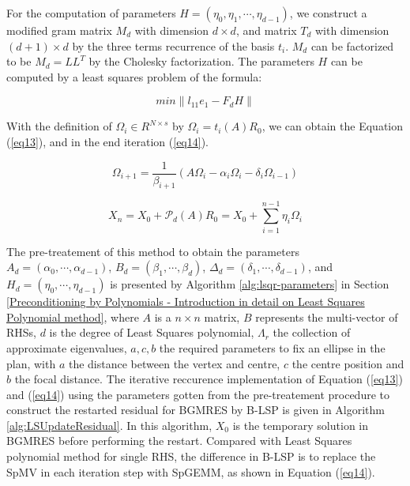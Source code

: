 For the computation of parameters $H=(\eta_0,\eta_1,\cdots,\eta_{d-1})$, we construct a modified gram matrix $M_d$ with dimension $d \times d$, and matrix $T_d$ with dimension $(d+1) \times d$ by the three terms recurrence of the basis $t_i$. $M_d$ can be factorized to be $M_d=LL^T$ by the Cholesky factorization. The parameters $H$ can be computed by a least squares problem of the formula:


\begin{equation}
\label{eq1122}
min \|l_{11}e_1-F_d H\|
\end{equation}


With the definition of \(\Omega_i \in R^{N \times s}\) by \(\Omega_i=t_i(A)R_0\), we can obtain the Equation (\ref{eq13}), and in the end iteration  (\ref{eq14}).

\begin{equation}
\label{eq13}
\Omega_{i+1}=\frac{1}{\beta_{i+1}}(A\Omega_i-\alpha_i\Omega_i-\delta_i\Omega_{i-1})
\end{equation}

\begin{equation}
\label{eq14}
X_n=X_0+\mathcal{P}_d(A)R_0=X_0+\sum_{i=1}^{n-1}\eta_i\Omega_i
\end{equation}

The pre-treatement of this method to obtain the parameters $A_d=(\alpha_0, \cdots, \alpha_{d-1})$, $B_d=(\beta_1, \cdots, \beta_d)$, $\Delta_d=(\delta_1, \cdots, \delta_{d-1})$, and $H_d=(\eta_0, \cdots, \eta_{d-1})$ is presented by Algorithm \ref{alg:lsqr-parameters} in Section \ref{Preconditioning by Polynomials - Introduction in detail on Least Squares Polynomial method}, where $A$ is a $n\times n$ matrix, $B$ represents the multi-vector of RHSs, $d$ is the degree of Least Squares polynomial, $\Lambda_r$ the collection of approximate eigenvalues, $a,c,b$ the required parameters to fix an ellipse in the plan, with $a$ the distance between the vertex and centre, $c$ the centre position and $b$ the focal distance. The iterative reccurence implementation of Equation (\ref{eq13}) and (\ref{eq14}) using the parameters gotten from the pre-treatement procedure to construct the restarted residual for BGMRES by B-LSP is given in Algorithm \ref{alg:LSUpdateResidual}. In this algorithm, $X_0$ is the temporary solution in BGMRES before performing the restart. Compared with Least Squares polynomial method for single RHS, the difference in B-LSP is to replace the SpMV in each iteration step with SpGEMM, as shown in Equation (\ref{eq14}).

